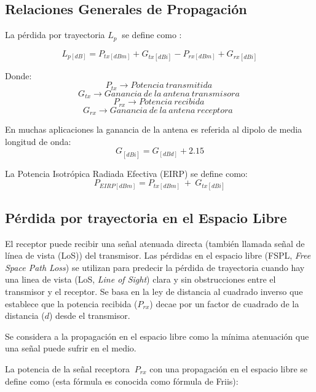 \subsection{Relaciones Generales de Propagación}

La pérdida por trayectoria $L_p\ $ se define como \parencite{Correia2018}:

\begin{equation}
L_{p[dB]}=P_{tx[dBm]}+G_{tx[dBi]}-P_{rx\left[dBm\right]}+G_{rx\left[dBi\right]}
\label{eqn:Lp}
\end{equation}

Donde:
\[P_{tx}\to Potencia\ transmitida\ \] 
\[G_{tx}\to Ganancia\ de\ la\ antena\ transmisora\ \] 
\[P_{rx}\to Potencia\ recibida\ \] 
\[G_{rx}\to Ganancia\ de\ la\ antena\ receptora\ \ \] 

En muchas aplicaciones la ganancia de la antena es referida al dipolo de media longitud de onda:
\begin{equation}
G_{[dBi]} = G_{[dBd]}+{2.15} 
\label{eqn:Gain}
\end{equation}

La Potencia Isotrópica Radiada Efectiva (EIRP) se define como:
\begin{equation}
P_{EIRP[dBm]}=P_{tx\left[dBm\right]}{\ +\ G}_{tx[dBi]}
\label{eqn:EIRP}
\end{equation}

\subsection{Pérdida por trayectoria en el Espacio Libre}

El receptor puede recibir una señal atenuada directa (también llamada señal de línea de vista (LoS)) del transmisor. Las pérdidas en el espacio libre (FSPL, \textit{Free Space Path Loss}) se utilizan para predecir la pérdida de trayectoria cuando hay una linea de vista (LoS, \textit{Line of Sight}) clara y sin obstrucciones entre el transmisor y el receptor. Se basa en la ley de distancia al cuadrado inverso que establece que la potencia recibida ($P_{rx}$) decae por un factor de cuadrado de la distancia ($d$) desde el transmisor.\newline

Se considera a la propagación en el espacio libre como la mínima atenuación que una señal puede sufrir en el medio.\newline

La potencia de la señal receptora ${\ P}_{rx}$ con una propagación en el espacio libre se define como (esta fórmula es conocida como fórmula de Friis):\newline

